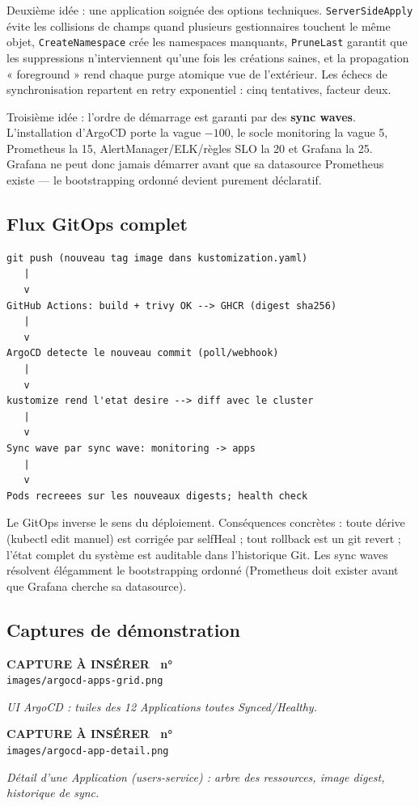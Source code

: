\documentclass[12pt,a4paper]{article}
\newcounter{capturecount}
\newcommand{\capturebox}[2]{%
\par\vspace{4mm}
\begin{tcolorbox}[enhanced,colback=yellow!5,colframe=black!55,boxrule=0.7pt,
  borderline={0.7pt}{0pt}{black!40,dashed},
  arc=2mm,left=6pt,right=6pt,top=7pt,bottom=7pt]
\centering
{\normalsize\sffamily\bfseries CAPTURE À INSÉRER \textbar\ n°\,\stepcounter{capturecount}\thecapturecount}\\[3pt]
{\large\texttt{images/#2}}\\[7pt]
\begin{minipage}{0.94\linewidth}\centering\itshape #1\end{minipage}
\end{tcolorbox}
\par\vspace{2mm}}
\begin{document}
Deuxième idée : une application soignée des options techniques. \texttt{ServerSideApply} évite les collisions de champs quand plusieurs gestionnaires touchent le même objet, \texttt{CreateNamespace} crée les namespaces manquants, \texttt{PruneLast} garantit que les suppressions n'interviennent qu'une fois les créations saines, et la propagation « foreground » rend chaque purge atomique vue de l'extérieur. Les échecs de synchronisation repartent en retry exponentiel : cinq tentatives, facteur deux.

Troisième idée : l'ordre de démarrage est garanti par des \textbf{sync waves}. L'installation d'ArgoCD porte la vague $-100$, le socle monitoring la vague 5, Prometheus la 15, AlertManager/ELK/règles SLO la 20 et Grafana la 25. Grafana ne peut donc jamais démarrer avant que sa datasource Prometheus existe --- le bootstrapping ordonné devient purement déclaratif.

\subsection{Flux GitOps complet}
\begin{lstlisting}[caption={Du commit au cluster --- zéro kubectl humain}]
git push (nouveau tag image dans kustomization.yaml)
   |
   v
GitHub Actions: build + trivy OK --> GHCR (digest sha256)
   |
   v
ArgoCD detecte le nouveau commit (poll/webhook)
   |
   v
kustomize rend l'etat desire --> diff avec le cluster
   |
   v
Sync wave par sync wave: monitoring -> apps
   |
   v
Pods recreees sur les nouveaux digests; health check
\end{lstlisting}

\begin{whybox}
Le GitOps inverse le sens du déploiement. Conséquences concrètes : toute dérive (kubectl edit manuel) est corrigée par selfHeal ; tout rollback est un git revert ; l'état complet du système est auditable dans l'historique Git. Les sync waves résolvent élégamment le bootstrapping ordonné (Prometheus doit exister avant que Grafana cherche sa datasource).
\end{whybox}

\subsection{Captures de démonstration}
\capturebox{UI ArgoCD : tuiles des 12 Applications toutes Synced/Healthy.}{argocd-apps-grid.png}

\capturebox{Détail d'une Application (users-service) : arbre des ressources, image digest, historique de sync.}{argocd-app-detail.png}
\end{document}
